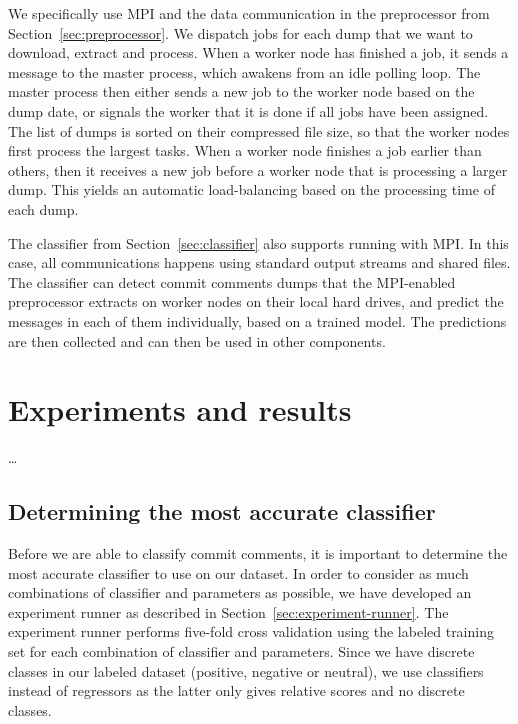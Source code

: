 \documentclass{article}
\begin{document}
We specifically use MPI and the data communication in the preprocessor from 
Section~\ref{sec:preprocessor}. We dispatch jobs for each dump that we want to 
download, extract and process. When a worker node has finished a job, it sends 
a message to the master process, which awakens from an idle polling loop. The 
master process then either sends a new job to the worker node based on the dump 
date, or signals the worker that it is done if all jobs have been assigned. The 
list of dumps is sorted on their compressed file size, so that the worker nodes 
first process the largest tasks. When a worker node finishes a job earlier than 
others, then it receives a new job before a worker node that is processing a
larger dump. This yields an automatic load-balancing based on the processing
time of each dump.

The classifier from Section~\ref{sec:classifier} also supports running with 
MPI\@. In this case, all communications happens using standard output streams
and shared files. The classifier can detect commit comments dumps that the 
MPI-enabled preprocessor extracts on worker nodes on their local hard drives, 
and predict the messages in each of them individually, based on a trained 
model. The predictions are then collected and can then be used in other 
components.

\section{Experiments and results}\label{sec:experiments-and-results}
\ldots

\subsection{Determining the most accurate classifier}\label{sec:most-accurate-classifier}
Before we are able to classify commit comments, it is important to determine
the most accurate classifier to use on our dataset. In order to consider as
much combinations of classifier and parameters as possible, we have developed
an experiment runner as described in Section~\ref{sec:experiment-runner}.
The experiment runner performs five-fold cross validation using the labeled
training set for each combination of classifier and parameters. Since we have
discrete classes in our labeled dataset (positive, negative or neutral), we
use classifiers instead of regressors as the latter only gives relative
scores and no discrete classes.
\end{document}
